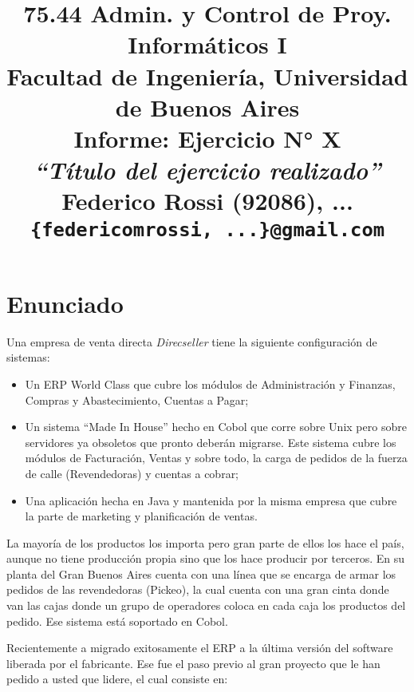 \documentclass{article}
\begin{document}
\title{
	  \Large 75.44 Admin. y Control de Proy. Informáticos I \\ 
	  \medskip\large Facultad de Ingeniería, Universidad de Buenos Aires \\
	  \bigskip\Huge Informe: Ejercicio N° X  \\
	  \medskip\Large\textit{``Título del ejercicio realizado''} \\
	  \bigskip\medskip\large\textbf{Federico Rossi (92086), ...} \\
	  \medskip\normalsize\texttt{\{federicomrossi, ...\}@gmail.com} \\
}
\date{}
\maketitle




\section{Enunciado}
	
	Una empresa de venta directa \textit{Direcseller} tiene la siguiente configuración de sistemas:

	\begin{itemize}
		\itemsep=3pt \topsep=0pt \partopsep=0pt \parskip=0pt \parsep=0pt

		\item Un ERP World Class que cubre los módulos de Administración y Finanzas, Compras y Abastecimiento, Cuentas a Pagar;

		\item Un sistema ``Made In House'' hecho en Cobol que corre sobre Unix pero sobre servidores ya obsoletos que pronto deberán migrarse. Este sistema cubre los módulos de Facturación, Ventas y sobre todo, la carga de pedidos de la fuerza de calle (Revendedoras) y cuentas a cobrar;

		\item Una aplicación hecha en Java y mantenida por la misma empresa que cubre la parte de marketing y planificación de ventas.

	\end{itemize}
	\medskip

	La mayoría de los productos los importa pero gran parte de ellos los hace el país, aunque no tiene producción propia sino que los hace producir por terceros. En su planta del Gran Buenos Aires cuenta con una línea que se encarga de armar los pedidos de las revendedoras (Pickeo), la cual cuenta con una gran cinta donde van las cajas donde un grupo de operadores coloca en cada caja los productos del pedido. Ese sistema está soportado en Cobol.
	\par
	Recientemente a migrado exitosamente el ERP a la última versión del software liberada por el fabricante. Ese fue el paso previo al gran proyecto que le han pedido a usted que lidere, el cual consiste en:
\end{document}
